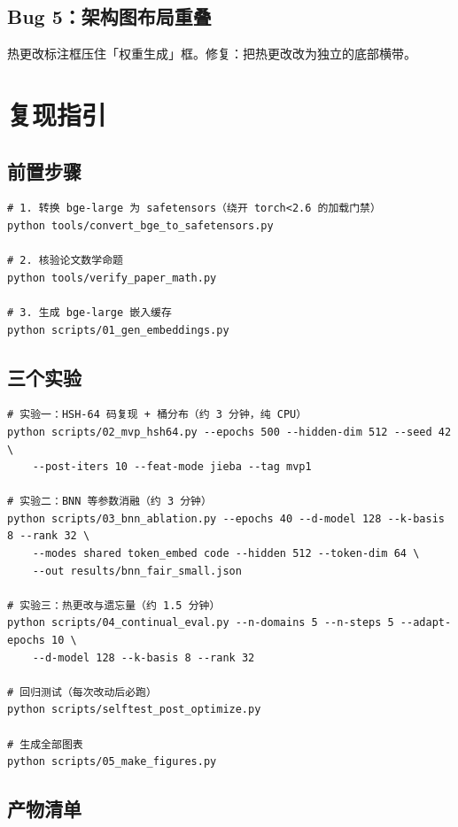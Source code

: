 \documentclass[11pt,a4paper]{ctexart}
\begin{document}
\subsection{Bug 5：架构图布局重叠}

热更改标注框压住「权重生成」框。修复：把热更改改为独立的底部横带。

\section{复现指引}

\subsection{前置步骤}

\begin{verbatim}
# 1. 转换 bge-large 为 safetensors（绕开 torch<2.6 的加载门禁）
python tools/convert_bge_to_safetensors.py

# 2. 核验论文数学命题
python tools/verify_paper_math.py

# 3. 生成 bge-large 嵌入缓存
python scripts/01_gen_embeddings.py
\end{verbatim}

\subsection{三个实验}

\begin{verbatim}
# 实验一：HSH-64 码复现 + 桶分布（约 3 分钟，纯 CPU）
python scripts/02_mvp_hsh64.py --epochs 500 --hidden-dim 512 --seed 42 \
    --post-iters 10 --feat-mode jieba --tag mvp1

# 实验二：BNN 等参数消融（约 3 分钟）
python scripts/03_bnn_ablation.py --epochs 40 --d-model 128 --k-basis 8 --rank 32 \
    --modes shared token_embed code --hidden 512 --token-dim 64 \
    --out results/bnn_fair_small.json

# 实验三：热更改与遗忘量（约 1.5 分钟）
python scripts/04_continual_eval.py --n-domains 5 --n-steps 5 --adapt-epochs 10 \
    --d-model 128 --k-basis 8 --rank 32

# 回归测试（每次改动后必跑）
python scripts/selftest_post_optimize.py

# 生成全部图表
python scripts/05_make_figures.py
\end{verbatim}

\subsection{产物清单}
\end{document}
